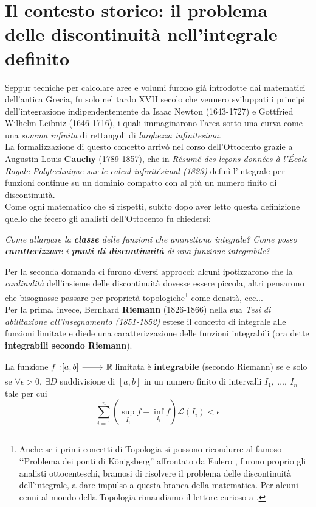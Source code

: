 \section{Il contesto storico: il problema delle discontinuità nell'integrale definito}
Seppur tecniche per calcolare aree e volumi furono già introdotte dai matematici dell'antica Grecia, fu solo nel tardo XVII secolo che vennero sviluppati i principi dell'integrazione indipendentemente da Isaac Newton (1643-1727) e Gottfried Wilhelm Leibniz (1646-1716), i quali immaginarono l'area sotto una curva come una \textit{somma infinita} di rettangoli di \textit{larghezza infinitesima}.\\
La formalizzazione di questo concetto arrivò nel corso dell'Ottocento grazie a Augustin-Louis \textbf{Cauchy} (1789-1857), che in \textit{Résumé des leçons données à l’École Royale Polytechnique sur le calcul infinitésimal (1823)} definì l'integrale per funzioni continue su un dominio compatto con al più un numero finito di discontinuità.\\
Come ogni matematico che si rispetti, subito dopo aver letto questa definizione quello che fecero gli analisti dell'Ottocento fu chiedersi:
\begin{center}
	\textit{Come allargare la \textbf{classe} delle funzioni che ammettono integrale?}
	\textit{Come posso \textbf{caratterizzare} i \textbf{punti di discontinuità} di una funzione
		integrabile?}\\
\end{center}
Per la seconda domanda ci furono diversi approcci: alcuni ipotizzarono che la \textit{cardinalità} dell'insieme delle discontinuità dovesse essere piccola, altri pensarono che bisognasse passare per proprietà topologiche\footnote{Anche se i primi concetti di Topologia si possono ricondurre al famoso ‘‘Problema dei ponti di Königsberg'' affrontato da Eulero , furono proprio gli analisti ottocenteschi, bramosi di risolvere il problema delle discontinuità dell'integrale, a dare impulso a questa branca della matematica. Per alcuni cenni al mondo della Topologia rimandiamo il lettore curioso a \cite{antucabertolotti:2021manualozzogeometria}.} come densità, ecc...\\
Per la prima, invece, Bernhard \textbf{Riemann} (1826-1866) nella sua \textit{Tesi di abilitazione all'insegnamento (1851-1852)} estese il concetto di integrale alle funzioni limitate e diede una caratterizzazione delle funzioni integrabili (ora dette \textbf{integrabili secondo Riemann}).
\begin{define}
La funzione $\funz{f}{\left[a,b\right]}{\realset}$ limitata è \textbf{integrabile} (secondo Riemann) se e solo se $\forall \epsilon>0,\ \exists D$ suddivisione di $\left[a,b\right]$ in un numero finito di intervalli $I_1,\ \ldots,\ I_n$ tale per cui
\begin{equation}
	\sum_{i=1}^{n}\left(\sup_{I_i}f-\inf_{I_i}f\right)\mathcal{L}\left(I_i\right)<\epsilon
\end{equation}
\end{define}
